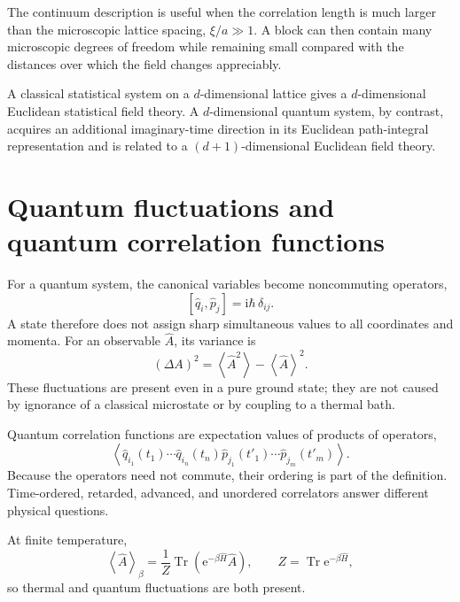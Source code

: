 \documentclass[11pt]{article}
\newcommand{\e}{\mathrm{e}}
\newcommand{\ii}{\mathrm{i}}
\newcommand{\avg}[1]{\left\langle #1\right\rangle}
\newcommand{\comm}[2]{\left[#1,#2\right]}
\begin{document}
\begin{keyidea}
The continuum description is useful when the correlation length is much
larger than the microscopic lattice spacing, $\xi/a\gg1$.  A block can then
contain many microscopic degrees of freedom while remaining small compared
with the distances over which the field changes appreciably.
\end{keyidea}

\newpage
\begin{warningbox}
A classical statistical system on a $d$-dimensional lattice gives a
$d$-dimensional Euclidean statistical field theory.  A $d$-dimensional
quantum system, by contrast, acquires an additional imaginary-time direction
in its Euclidean path-integral representation and is related to a
$(d+1)$-dimensional Euclidean field theory.
\end{warningbox}

\section{Quantum fluctuations and quantum correlation functions}

For a quantum system, the canonical variables become noncommuting operators,
\begin{equation}
  \comm{\hat q_i}{\hat p_j}=\ii\hbar\,\delta_{ij}.
  \label{eq:CCR}
\end{equation}
A state therefore does not assign sharp simultaneous values to all
coordinates and momenta.  For an observable $\hat A$, its variance is
\begin{equation}
  (\Delta A)^2
  =\avg{\hat A^2}-\avg{\hat A}^2.
\end{equation}
These fluctuations are present even in a pure ground state; they are not
caused by ignorance of a classical microstate or by coupling to a thermal
bath.

Quantum correlation functions are expectation values of products of
operators,
\begin{equation}
  \avg{
    \hat q_{i_1}(t_1)\cdots
    \hat q_{i_n}(t_n)
    \hat p_{j_1}(t'_1)\cdots
    \hat p_{j_m}(t'_m)
  }.
  \label{eq:quantumcorr}
\end{equation}
Because the operators need not commute, their ordering is part of the
definition.  Time-ordered, retarded, advanced, and unordered correlators
answer different physical questions.

At finite temperature,
\begin{equation}
  \avg{\hat A}_\beta
  =\frac{1}{Z}\operatorname{Tr}
   \left(\e^{-\beta\hat H}\hat A\right),
  \qquad
  Z=\operatorname{Tr}\e^{-\beta\hat H},
\end{equation}
so thermal and quantum fluctuations are both present.
\end{document}
